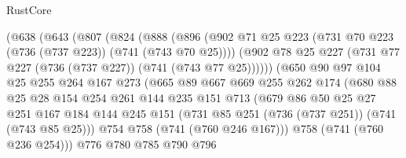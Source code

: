 \begin{lexlean}{RustCore}
\begin{coremodule}
                    (@638
                      (@643
                        (@807
                          (@824
                            (@888
                              (@896
                                (@902
                                  @71
                                  @25
                                  @223
                                  (@731 @70 @223 (@736 (@737 @223)) (@741 (@743 @70 @25))))
                                (@902
                                  @78
                                  @25
                                  @227
                                  (@731 @77 @227 (@736 (@737 @227)) (@741 (@743 @77 @25))))))
                            (@650
                              @90
                              @97
                              @104
                              @25
                              @255
                              @264
                              @167
                              @273
                              (@665
                                @89
                                @667
                                @669
                                @255
                                @262
                                @174
                                (@680
                                  @88
                                  @25
                                  @28
                                  @154
                                  @254
                                  @261
                                  @144
                                  @235
                                  @151
                                  @713
                                  (@679
                                    @86
                                    @50
                                    @25
                                    @27
                                    @251
                                    @167
                                    @184
                                    @144
                                    @245
                                    @151
                                    (@731 @85 @251 (@736 (@737 @251)) (@741 (@743 @85 @25)))
                                    @754
                                    @758
                                    (@741 (@760 @246 @167)))
                                  @758
                                  (@741 (@760 @236 @254)))
                                @776
                                @780
                                @785
                                @790
                                @796

\end{coremodule}
\end{lexlean}
